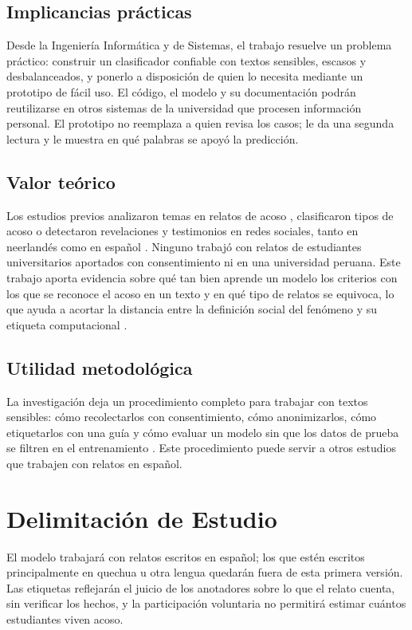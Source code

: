 \subsection{Implicancias prácticas}
Desde la Ingeniería Informática y de Sistemas, el trabajo resuelve un problema práctico: construir un clasificador confiable con textos sensibles, escasos y desbalanceados, y ponerlo a disposición de quien lo necesita mediante un prototipo de fácil uso. El código, el modelo y su documentación \citep{gebru2021, mitchell2019} podrán reutilizarse en otros sistemas de la universidad que procesen información personal. El prototipo no reemplaza a quien revisa los casos; le da una segunda lectura y le muestra en qué palabras se apoyó la predicción.

\subsection{Valor teórico}
Los estudios previos analizaron temas en relatos de acoso \citep{karami2020}, clasificaron tipos de acoso \citep{wijaya2022} o detectaron revelaciones y testimonios en redes sociales, tanto en neerlandés \citep{gorissen2023} como en español \citep{escobar2022}. Ninguno trabajó con relatos de estudiantes universitarios aportados con consentimiento ni en una universidad peruana. Este trabajo aporta evidencia sobre qué tan bien aprende un modelo los criterios con los que se reconoce el acoso en un texto y en qué tipo de relatos se equivoca, lo que ayuda a acortar la distancia entre la definición social del fenómeno y su etiqueta computacional \citep{dutta2025}.

\subsection{Utilidad metodológica}
La investigación deja un procedimiento completo para trabajar con textos sensibles: cómo recolectarlos con consentimiento, cómo anonimizarlos, cómo etiquetarlos con una guía y cómo evaluar un modelo sin que los datos de prueba se filtren en el entrenamiento \citep{kapoor2023}. Este procedimiento puede servir a otros estudios que trabajen con relatos en español.

\section{Delimitación de Estudio}
El modelo trabajará con relatos escritos en español; los que estén escritos principalmente en quechua u otra lengua quedarán fuera de esta primera versión. Las etiquetas reflejarán el juicio de los anotadores sobre lo que el relato cuenta, sin verificar los hechos, y la participación voluntaria no permitirá estimar cuántos estudiantes viven acoso.

